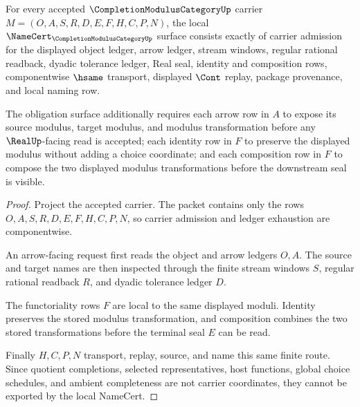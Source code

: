\begin{theorem}
\label{thm:completion-modulus-category-namecert-obligations}
For every accepted $\CompletionModulusCategoryUp$ carrier $M=(O,A,S,R,D,E,F,H,C,P,N)$, the local $\NameCert_{\CompletionModulusCategoryUp}$ surface consists exactly of carrier admission for the displayed object ledger, arrow ledger, stream windows, regular rational readback, dyadic tolerance ledger, Real seal, identity and composition rows, componentwise $\hsame$ transport, displayed $\Cont$ replay, package provenance, and local naming row.

The obligation surface additionally requires each arrow row in $A$ to expose its source modulus, target modulus, and modulus transformation before any $\RealUp$-facing read is accepted; each identity row in $F$ to preserve the displayed modulus without adding a choice coordinate; and each composition row in $F$ to compose the two displayed modulus transformations before the downstream seal is visible.
\end{theorem}
\begin{proof}
Project the accepted carrier. The packet contains only the rows $O,A,S,R,D,E,F,H,C,P,N$, so carrier admission and ledger exhaustion are componentwise.

An arrow-facing request first reads the object and arrow ledgers $O,A$. The source and target names are then inspected through the finite stream windows $S$, regular rational readback $R$, and dyadic tolerance ledger $D$.

The functoriality rows $F$ are local to the same displayed moduli. Identity preserves the stored modulus transformation, and composition combines the two stored transformations before the terminal seal $E$ can be read.

Finally $H,C,P,N$ transport, replay, source, and name this same finite route. Since quotient completions, selected representatives, host functions, global choice schedules, and ambient completeness are not carrier coordinates, they cannot be exported by the local NameCert.
\end{proof}

